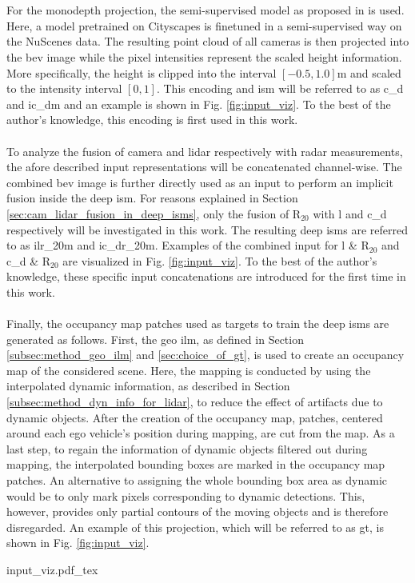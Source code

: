 \\\\
For the \gls{monodepth} projection, the semi-supervised model as proposed in \cite{guizilini2020robust} is used. Here, a model pretrained on Cityscapes is finetuned in a semi-supervised way on the NuScenes data. The resulting point cloud of all cameras is then projected into the \gls{bev} image while the pixel intensities represent the scaled height information. More specifically, the height is clipped into the interval $[-0.5,1.0]$m and scaled to the intensity interval $[0,1]$. This encoding and \gls{ism} will be referred to as \gls{c_d} and \gls{ic_dm} and an example is shown in Fig. \ref{fig:input_viz}. To the best of the author's knowledge, this encoding is first used in this work.
\\\\
To analyze the fusion of camera and lidar respectively with radar measurements, the afore described input representations will be concatenated channel-wise. The combined \gls{bev} image is further directly used as an input to perform an implicit fusion inside the deep \gls{ism}. For reasons explained in Section \ref{sec:cam_lidar_fusion_in_deep_isms}, only the fusion of R$_{20}$ with \gls{l} and \gls{c_d} respectively will be investigated in this work. The resulting deep \gls{ism}s are referred to as \gls{ilr_20m} and \gls{ic_dr_20m}. Examples of the combined input for \gls{l} \& R$_{20}$ and \gls{c_d} \& R$_{20}$ are visualized in Fig. \ref{fig:input_viz}. To the best of the author's knowledge, these specific input concatenations are introduced for the first time in this work.
\\\\
Finally, the occupancy map patches used as targets to train the deep \gls{ism}s are generated as follows. First, the geo \gls{ilm}, as defined in Section \ref{subsec:method_geo_ilm} and \ref{sec:choice_of_gt}, is used to create an occupancy map of the considered scene. Here, the mapping is conducted by using the interpolated dynamic information, as described in Section \ref{subsec:method_dyn_info_for_lidar}, to reduce the effect of artifacts due to dynamic objects. After the creation of the occupancy map, patches, centered around each ego vehicle's position during mapping, are cut from the map. As a last step, to regain the information of dynamic objects filtered out during mapping, the interpolated bounding boxes are marked in the occupancy map patches. An alternative to assigning the whole bounding box area as dynamic would be to only mark pixels corresponding to dynamic detections. This, however, provides only partial contours of the moving objects and is therefore disregarded. An example of this projection, which will be referred to as \gls{gt}, is shown in Fig. \ref{fig:input_viz}.
\begin{center}
	{input_viz.pdf_tex}
\end{center}
%
